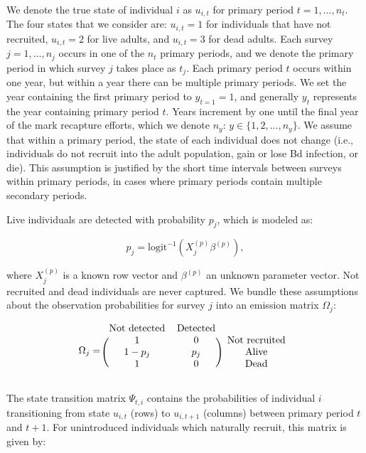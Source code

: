 \documentclass[9pt,twoside,lineno]{pnas-new}
\begin{document}
We denote the true state of individual \(i\) as \(u_{i, t}\) for primary
period \(t = 1,..., n_t\). The four states that we consider are:
\(u_{i, t} = 1\) for individuals that have not recruited,
\(u_{i, t} =2\) for live adults, and \(u_{i, t} = 3\) for dead adults.
Each survey \(j=1, ..., n_j\) occurs in one of the \(n_t\) primary
periods, and we denote the primary period in which survey \(j\) takes
place as \(t_j\). Each primary period \(t\) occurs within one year, but
within a year there can be multiple primary periods. We set the year
containing the first primary period to \(y_{t = 1} = 1\), and generally
\(y_t\) represents the year containing primary period \(t\). Years
increment by one until the final year of the mark recapture efforts,
which we denote \(n_y\): \(y \in \{1, 2, ..., n_y\}\). We assume that
within a primary period, the state of each individual does not change
(i.e., individuals do not recruit into the adult population, gain or
lose Bd infection, or die). This assumption is justified by the short
time intervals between surveys within primary periods, in cases where
primary periods contain multiple secondary periods.

Live individuals are detected with probability \(p_j\), which is modeled
as:

\[p_j = \text{logit}^{-1}(X_j^{(p)} \beta^{(p)}),\]

where \(X_j^{(p)}\) is a known row vector and \(\beta^{(p)}\) an unknown
parameter vector. Not recruited and dead individuals are never captured.
We bundle these assumptions about the observation probabilities for
survey \(j\) into an emission matrix \(\Omega_j\):

\[
\Omega_j =
\begin{blockarray}{ccc}
  \text{Not detected} & \text{Detected} \\
\begin{block}{(cc)c}
  1 & 0 & \text{Not recruited} \\
  1 - p_j & p_j & \text{Alive} \\
  1 & 0 & \text{Dead} \\
\end{block}
\end{blockarray}
\]

The state transition matrix \(\Psi_{t, i}\) contains the probabilities
of individual \(i\) transitioning from state \(u_{i, t}\) (rows) to
\(u_{i, t+1}\) (columns) between primary period \(t\) and \(t+1\). For
unintroduced individuals which naturally recruit, this matrix is given
by:
\end{document}
